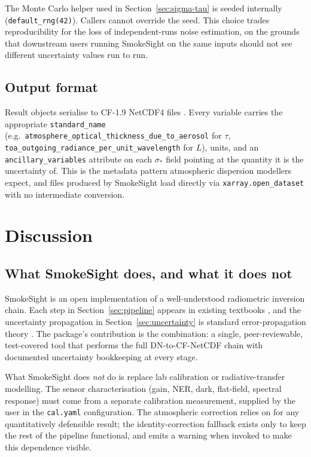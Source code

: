 \documentclass[11pt, a4paper]{article}
\begin{document}
The Monte Carlo helper used in
Section~\ref{sec:sigma-tau} is seeded internally
(\texttt{default\_rng(42)}). Callers cannot override the seed. This
choice trades reproducibility for the loss of independent-runs noise
estimation, on the grounds that downstream users running SmokeSight on
the same inputs should not see different uncertainty values run to run.

\subsection{Output format}

Result objects serialise to CF-1.9 NetCDF4 files
\cite{eaton2003netcdf}. Every variable carries the appropriate
\texttt{standard\_name} (e.g.\ \texttt{atmosphere\_optical\_thickness\_due\_to\_aerosol}
for $\tau$, \texttt{toa\_outgoing\_radiance\_per\_unit\_wavelength}
for $L$), units, and an \texttt{ancillary\_variables} attribute on each
$\sigma_*$ field pointing at the quantity it is the uncertainty of.
This is the metadata pattern atmospheric dispersion modellers
\cite{stein2015hysplit, stohl2005flexpart, lin2003stilt} expect, and
files produced by SmokeSight load directly via
\texttt{xarray.open\_dataset} \cite{hoyer2017xarray} with no
intermediate conversion.

\section{Discussion}
\label{sec:discussion}

\subsection{What SmokeSight does, and what it does not}

SmokeSight is an open implementation of a well-understood radiometric
inversion chain. Each step in Section~\ref{sec:pipeline} appears in
existing textbooks \cite{schott2007remote, holst2003electro,
liou2002introduction}, and the uncertainty propagation in
Section~\ref{sec:uncertainty} is standard error-propagation theory
\cite{rodgers2000inverse, wilks2011statistical}. The package's
contribution is the combination: a single, peer-reviewable,
test-covered tool that performs the full DN-to-CF-NetCDF chain with
documented uncertainty bookkeeping at every stage.

What SmokeSight does \emph{not} do is replace lab calibration or
radiative-transfer modelling. The sensor characterisation (gain, NER,
dark, flat-field, spectral response) must come from a separate
calibration measurement, supplied by the user in the
\texttt{cal.yaml} configuration. The atmospheric correction relies on
\cite{vermote1997second, berk2014modtran} for any quantitatively
defensible result; the identity-correction fallback exists only to keep
the rest of the pipeline functional, and emits a warning when invoked
to make this dependence visible.
\end{document}
